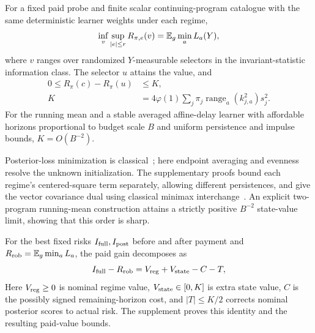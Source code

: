 \begin{theorem}
For a fixed paid probe and finite scalar continuing-program catalogue with the same deterministic learner weights under each regime,
\begin{equation}
\inf_v\sup_{|e|\le r}R_{\pi,e}(v)=\mathbb{E}_g\min_aL_a(Y),
\label{eq:conditional-minimax-value}
\end{equation}
where $v$ ranges over randomized $Y$-measurable selectors in the invariant-statistic information class.
The selector $u$ attains the value, and
\begin{align}
0\le R_\pi(c)-R_\pi(u)&\le K,\nonumber\\
K&=4\varphi(1)\sum_j\pi_j\operatorname{range}_a(k_{j,a}^2)s_j^2.
\label{eq:state-selection-ceiling-main}
\end{align}
For the running mean and a stable averaged affine-delay learner with affordable horizons proportional to budget scale $B$ and uniform persistence and impulse bounds, $K=O(B^{-2})$.
\label{thm:conditional-value}
\end{theorem}

Posterior-loss minimization is classical~\cite{moustakides2012joint,vasconcelos2020observation,reinhard2026minimax}; here endpoint averaging and evenness resolve the unknown initialization.
The supplementary proofs bound each regime's centered-square term separately, allowing different persistences, and give the vector covariance dual using classical minimax interchange~\cite{sion1958minimax}.
An explicit two-program running-mean construction attains a strictly positive $B^{-2}$ state-value limit, showing that this order is sharp.

For the best fixed risks $I_{\rm full},I_{\rm post}$ before and after payment and $R_{\rm rob}=\mathbb{E}_g\min_aL_a$, the paid gain decomposes as
\[
I_{\rm full}-R_{\rm rob}=V_{\rm reg}+V_{\rm state}-C-T,
\]
Here $V_{\rm reg}\ge0$ is nominal regime value, $V_{\rm state}\in[0,K]$ is extra state value, $C$ is the possibly signed remaining-horizon cost, and $|T|\le K/2$ corrects nominal posterior scores to actual risk.
The supplement proves this identity and the resulting paid-value bounds.


